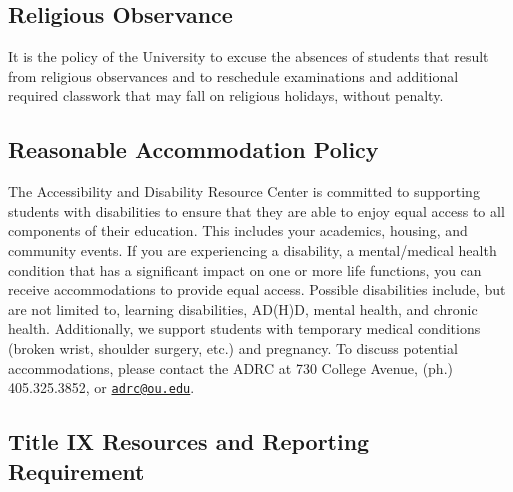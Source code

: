 \documentclass[11pt,english]{article}
\begin{document}
\subsection*{Religious Observance}

It is the policy of the University to excuse the absences of students that result from religious observances and to reschedule examinations and additional required classwork that may fall on religious holidays, without penalty.

\subsection*{Reasonable Accommodation Policy}

The Accessibility and Disability Resource Center is committed to supporting students with disabilities to ensure that they are able to enjoy equal access to all components of their education.  This includes your academics, housing, and community events.  If you are experiencing a disability, a mental/medical health condition that has a significant impact on one or more life functions, you can receive accommodations to provide equal access.  Possible disabilities include, but are not limited to, learning disabilities, AD(H)D, mental health, and chronic health.  Additionally, we support students with temporary medical conditions (broken wrist, shoulder surgery, etc.) and pregnancy.  To discuss potential accommodations, please contact the ADRC at 730 College Avenue, (ph.) 405.325.3852, or \href{mailto:adrc@ou.edu}{\texttt{adrc@ou.edu}}. 

\subsection*{Title IX Resources and Reporting Requirement}
\end{document}
